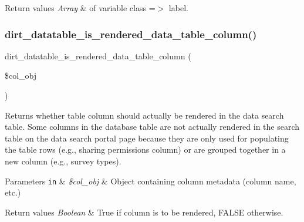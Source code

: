 \begin{DoxyRetVals}{Return values}
{\em Array} & of variable class =$>$ label. \\
\hline
\end{DoxyRetVals}
\mbox{\label{dirt__datatable_8data__search__portal_8inc_a019764deef9f6d71430ca593280f620e}} 
\subsubsection{\texorpdfstring{dirt\+\_\+datatable\+\_\+is\+\_\+rendered\+\_\+data\+\_\+table\+\_\+column()}{dirt\_datatable\_is\_rendered\_data\_table\_column()}}
{\footnotesize\ttfamily dirt\+\_\+datatable\+\_\+is\+\_\+rendered\+\_\+data\+\_\+table\+\_\+column (\begin{DoxyParamCaption}\item[{}]{\$col\+\_\+obj }\end{DoxyParamCaption})}

Returns whether table column should actually be rendered in the data search table. Some columns in the database table are not actually rendered in the search table on the data search portal page because they are only used for populating the table rows (e.\+g., sharing permissions column) or are grouped together in a new column (e.\+g., survey types).


\begin{DoxyParams}[1]{Parameters}
\mbox{\tt in}  & {\em \$col\+\_\+obj} & Object containing column metadata (column name, etc.)\\
\hline
\end{DoxyParams}

\begin{DoxyRetVals}{Return values}
{\em Boolean} & True if column is to be rendered, F\+A\+L\+SE otherwise. \\
\hline
\end{DoxyRetVals}
\mbox{\label{dirt__datatable_8data__search__portal_8inc_ac694b6f1043d9715e4ba411788222992}} 

